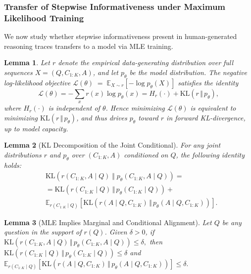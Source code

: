 \documentclass{article}
\newtheorem{lemma}{Lemma}
\begin{document}
\subsubsection{Transfer of Stepwise Informativeness under Maximum Likelihood Training}

We now study whether stepwise informativeness present in human-generated reasoning traces transfers to a model via MLE training. 

\begin{lemma}
\label{lemma:log-likelihood_identity}
Let $r$ denote the empirical data-generating distribution over full sequences 
$X = (Q,C_{1:K},A)$, and let $p_\theta$ be the model distribution.  
The negative log-likelihood objective $\mathcal{L}(\theta) \;=\; \mathbb{E}_{X\sim r}\!\left[-\log p_\theta(X)\right]$
satisfies the identity
\[
\mathcal{L}(\theta)
= -\sum_{x} r(x)\log p_\theta(x)
= H_r(\cdot) + \mathrm{KL}\!\left(r \,\Vert\, p_\theta\right),
\]
where $H_r(\cdot)$ is independent of $\theta$.  
Hence minimizing $\mathcal{L}(\theta)$ is equivalent to minimizing 
$\mathrm{KL}(r \,\Vert\, p_\theta)$, and thus drives $p_\theta$ toward $r$ in forward KL-divergence, up to model capacity.
\end{lemma}

\begin{lemma}[KL Decomposition of the Joint Conditional]
\label{lemma:KLDecompositionoftheJointConditional}
For any joint distributions $r$ and $p_\theta$ over $(C_{1:K},A)$ conditioned on $Q$,
the following identity holds:
\begin{equation*}
\begin{aligned}
&\mathrm{KL}\!\left(
r(C_{1:K},A\mid Q)
\;\Vert\;
p_\theta(C_{1:K},A\mid Q)
\right)
= \\
&= \mathrm{KL}\!\left(r(C_{1:K}\mid Q)\,\Vert\,p_\theta(C_{1:K}\mid Q)\right)
+ \\
&\mathbb{E}_{r(C_{1:K}\mid Q)}
\!\left[
\mathrm{KL}\!\left(
r(A\mid Q,C_{1:K})
\,\Vert\,
p_\theta(A\mid Q,C_{1:K})
\right)
\right].
\end{aligned}
\end{equation*}
\label{lemma:joint-kl-decomposition}
\end{lemma}

\begin{lemma}[MLE Implies Marginal and Conditional Alignment]
\label{lemma:MLE_implies_alignment}
Let $Q$ be any question in the support of $r(Q)$.
Given $\delta>0$, if
\(
\mathrm{KL}\!\left(
r(C_{1:K},A \mid Q)\,
\Vert\,
p_\theta(C_{1:K},A \mid Q)
\right)
\le \delta,
\label{eq:joint-smallness}
\)
then 
\(
\mathrm{KL}\!\left(
    r(C_{1:K}\mid Q)
    \,\Vert\,
    p_\theta(C_{1:K}\mid Q)
    \right)
    \le \delta
\) and 
\(
\mathbb{E}_{r(C_{1:K}\mid Q)}
    \!\left[
    \mathrm{KL}\!\left(
    r(A\mid Q,C_{1:K})
    \,\Vert\,
    p_\theta(A\mid Q,C_{1:K})
    \right)
    \right]
    \le \delta .
\)
\end{lemma}
\end{document}
